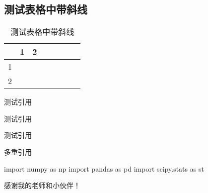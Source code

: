 \documentclass{SUIBEthesis}
\numberwithin{figure}{section}
\numberwithin{table}{section}
\begin{document}
\begin{sloppypar}
\begin{table}[htbp]
\end{table}%


\subsection{测试表格中带斜线}

\begin{table}[htbp]
  \centering
  \caption{测试表格中带斜线}
  \begin{tabular}{cccccccc}
    \toprule
    \toprule
    \diagbox{$\lambda$}{$\alpha$}& 1& 2 \\
    \midrule
    1 & & \\
    2 & & \\
    \bottomrule
    \bottomrule
  \end{tabular}%
  \label{tab:md1}%
\end{table}%







测试引用\cite{Machines2002}

测试引用\citet{Machines2002}

测试引用\citep{Machines2002}

多重引用\citet{Machines2002,RandomForests2001}


\xiaosi




\begin{myappendix}
\begin{python}[moreemph={[4]42},caption={RV分解}]
import numpy as np
import pandas as pd
import scipy.stats as st
\end{python}
\end{myappendix}






\begin{mythanks}

\thispagestyle{empty}
感谢我的老师和小伙伴！
\end{mythanks}

\end{sloppypar}
\end{document}
